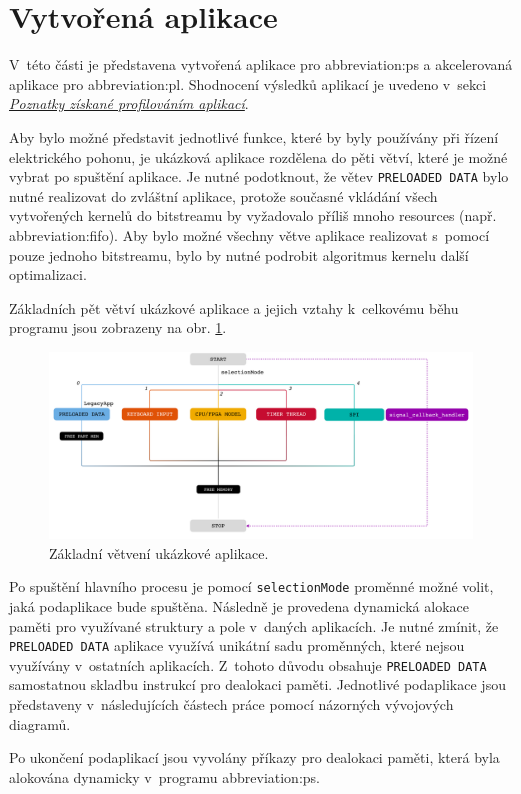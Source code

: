 \documentclass[a4paper, twoside, 11pt]{article}
\newcommand{\fbar}{\FloatBarrier}
\begin{document}
\section{Vytvořená aplikace}\label{sec:vytvorena-aplikace}
 V~této části je představena vytvořená aplikace pro \gls{abbreviation:ps} a akcelerovaná aplikace pro \gls{abbreviation:pl}. Shodnocení výsledků aplikací je uvedeno v~sekci \hyperref[sec:poznatky-ziskane-profilovanim-aplikaci]{\textit{Poznatky získané profilováním aplikací}}.\par
 Aby bylo možné představit jednotlivé funkce, které by byly používány při řízení elektrického pohonu, je ukázková aplikace rozdělena do pěti větví, které je možné vybrat po spuštění aplikace. Je nutné podotknout, že větev \texttt{PRELOADED DATA} bylo nutné realizovat do zvláštní aplikace, protože současné vkládání všech vytvořených kernelů do bitstreamu by vyžadovalo příliš mnoho resources (např. \gls{abbreviation:fifo}). Aby bylo možné všechny větve aplikace realizovat s~pomocí pouze jednoho bitstreamu, bylo by nutné podrobit algoritmus kernelu další optimalizaci.\par
 Základních pět větví ukázkové aplikace a jejich vztahy k~celkovému běhu programu jsou zobrazeny na obr. \ref{fig:application-overview}.

 \begin{figure}[htbp!]
	\centering
	\includegraphics[width=1\textwidth]{src/pdf/application-overview.pdf}
	\caption{Základní větvení ukázkové aplikace.}
	\label{fig:application-overview}
\end{figure}
	Po spuštění hlavního procesu je pomocí \texttt{selectionMode} proměnné možné volit, jaká podaplikace bude spuštěna. Následně je provedena dynamická alokace paměti pro využívané struktury a pole v~daných aplikacích. Je nutné zmínit, že \texttt{PRELOADED DATA} aplikace využívá unikátní sadu proměnných, které nejsou využívány v~ostatních aplikacích. Z~tohoto důvodu obsahuje \texttt{PRELOADED DATA} samostatnou skladbu instrukcí pro dealokaci paměti. Jednotlivé podaplikace jsou představeny v~následujících částech práce pomocí názorných vývojových diagramů.\par
	Po ukončení podaplikací jsou vyvolány příkazy pro dealokaci paměti, která byla alokována dynamicky v~programu \gls{abbreviation:ps}.\par
	\fbar
\end{document}
